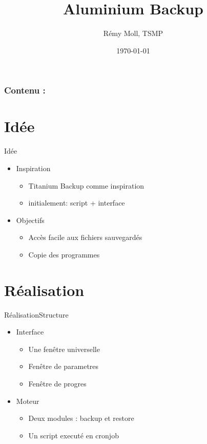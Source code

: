 \documentclass{beamer}
\title{Aluminium Backup}
\date{\today}
\author{Rémy Moll, TSMP}
\institute{DFG-Freiburg}
\begin{document}
	\begin{frame}[plain,t]
		\titlepage
	\end{frame}

	\begin{frame}%
		\frametitle{Contenu :}
		\tableofcontents
	\end{frame}

	\section{Idée}

	\begin{frame}{Idée}
	  \begin{itemize}
			\item Inspiration
			\begin{itemize}
				\item Titanium Backup comme inspiration
				\item initialement: script + interface
			\end{itemize}
			\item Objectifs
			\begin{itemize}
				\item Accès facile aux fichiers sauvegardés
				\item Copie des programmes
			\end{itemize}
	  \end{itemize}
	\end{frame}

	\section{Réalisation}

	\begin{frame}{Réalisation}{Structure}
	  \begin{itemize}
			\item Interface
			\begin{itemize}
			\item Une fenêtre universelle
			\item Fenêtre de parametres
			\item Fenêtre de progres
			\end{itemize}
			\item Moteur
			\begin{itemize}
				\item Deux modules : backup et restore
				\item Un script executé en cronjob
			\end{itemize}
	  \end{itemize}
	\end{frame}
\end{document}

